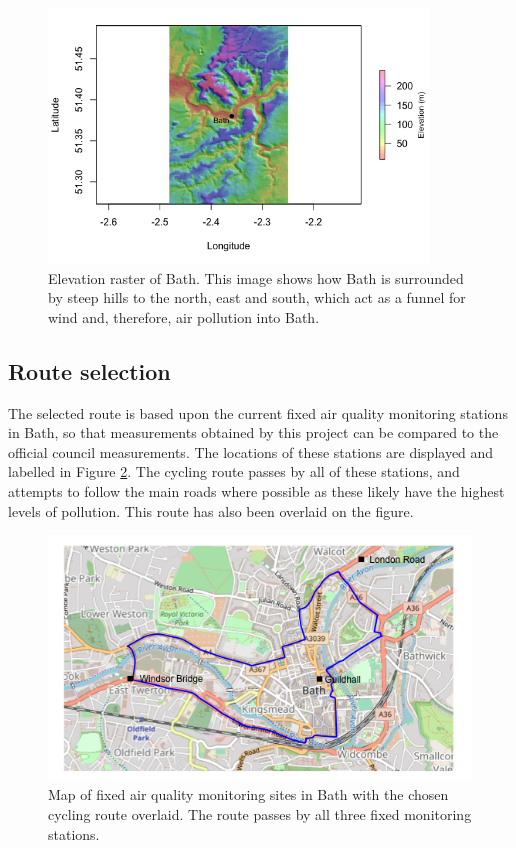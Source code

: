\documentclass[11pt,twosided,a4paper]{report}
\begin{document}
\begin{figure}[!htb]
\centering
\includegraphics[width=0.9\textwidth]{images/bath_elevation_large}
\caption[Elevation raster of Bath.]{Elevation raster of Bath. This image shows how Bath is surrounded by steep hills to the north, east and south, which act as a funnel for wind and, therefore, air pollution into Bath.}
\label{bath_elevation}
\end{figure}

\subsection{Route selection} \label{route_selection}

The selected route is based upon the current fixed air quality monitoring stations in Bath, so that measurements obtained by this project can be compared to the official council measurements. The locations of these stations are displayed and labelled in Figure \ref{cycling_route}. The cycling route passes by all of these stations, and attempts to follow the main roads where possible as these likely have the highest levels of pollution. This route has also been overlaid on the figure.

\begin{figure}[!tb]
  \centering
  \includegraphics[width=0.7\linewidth]{cycling_route}
  \caption[Cycling route.]{Map of fixed air quality monitoring sites in Bath with the chosen cycling route overlaid. The route passes by all three fixed monitoring stations.}
  \label{cycling_route}
\end{figure}
\end{document}
